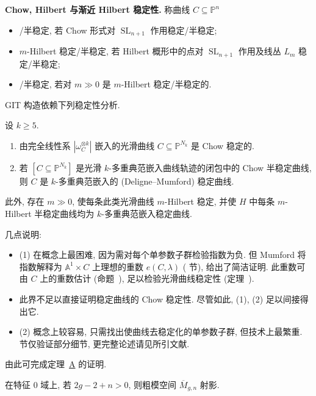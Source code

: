 \noindent\textbf{Chow, Hilbert 与渐近 Hilbert 稳定性.} 称曲线 $C\subseteq\mathbb P^n$
\begin{itemize}
\item {}/半稳定, 若 Chow 形式对 $\operatorname{SL}_{n+1}$ 作用稳定/半稳定;
\item $m$-Hilbert 稳定/半稳定, 若 Hilbert 概形中的点对 $\operatorname{SL}_{n+1}$ 作用及线丛 $L_m$ 稳定/半稳定;
\item {}/半稳定, 若对 $m\gg0$ 是 $m$-Hilbert 稳定/半稳定的.
\end{itemize}
GIT 构造依赖下列稳定性分析.
\begin{theorem}\label{src:6.8.5}
设 $k\geq5$.
\begin{enumerate}[(1)]
\item 由完全线性系 $|\omega_C^{\otimes k}|$ 嵌入的光滑曲线 $C\subseteq\mathbb P^{N_k}$ 是 Chow 稳定的.
\item 若 $[C\subseteq\mathbb P^{N_k}]$ 是光滑 $k$-多重典范嵌入曲线轨迹的闭包中的 Chow 半稳定曲线, 则 $C$ 是 $k$-多重典范嵌入的 (Deligne--Mumford) 稳定曲线.
\end{enumerate}
此外, 存在 $m\gg0$, 使每条此类光滑曲线 $m$-Hilbert 稳定, 并使 $H$ 中每条 $m$-Hilbert 半稳定曲线均为 $k$-多重典范嵌入稳定曲线.
\end{theorem}
几点说明:
\begin{itemize}
\item (1) 在概念上最困难, 因为需对每个单参数子群检验指数为负. 但 Mumford 将指数解释为 $\mathbb A^1\times C$ 上理想的重数 $e(C,\allowbreak \lambda)$ ( 节), 给出了简洁证明. 此重数可由 $C$ 上的重数估计 (命题~), 足以检验光滑曲线稳定性 (定理~).
\item 此界不足以直接证明稳定曲线的 Chow 稳定性. 尽管如此, (1), (2) 足以间接得出它.
\item (2) 概念上较容易, 只需找出使曲线去稳定化的单参数子群, 但技术上最繁重.  节仅验证部分细节, 更完整论述请见所引文献.
\end{itemize}
由此可完成定理~\hyperref[thm:A]{A} 的证明.
\begin{theorem}\label{src:6.8.6}
在特征 $0$ 域上, 若 $2g-2+n>0$, 则粗模空间 $\overline M_{g,\allowbreak n}$ 射影.
\end{theorem}
